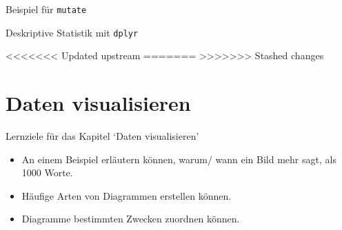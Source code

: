 \begin{frame}[fragile]{Beispiel für \texttt{mutate}}

\begin{Shaded}
\end{Shaded}

\end{frame}

\begin{frame}[fragile]{Deskriptive Statistik mit \texttt{dplyr}}

\begin{Shaded}
\begin{Highlighting}[]
<<<<<<< Updated upstream
\StringTok{ }\OperatorTok{-}
=======
\StringTok{ }
>>>>>>> Stashed changes
\end{Highlighting}
\end{Shaded}

\end{frame}

\section{Daten visualisieren}\label{vis}

\begin{frame}{Lernziele für das Kapitel `Daten visualisieren'}

\begin{itemize}
\tightlist
\item
  An einem Beispiel erläutern können, warum/ wann ein Bild mehr sagt,
  als 1000 Worte.
\item
  Häufige Arten von Diagrammen erstellen können.
\item
  Diagramme bestimmten Zwecken zuordnen können.
\end{itemize}

\end{frame}

